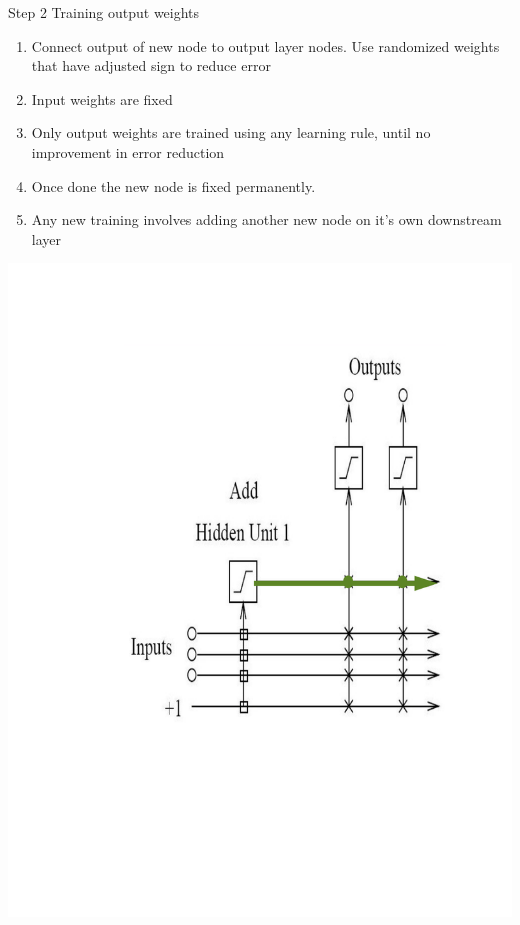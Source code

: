 \documentclass[presentation]{beamer}
\begin{document}
\begin{frame}[label={sec:org085d5cb}]{Step 2 Training output weights}
\begin{enumerate}
  \item Connect output of new node to output layer nodes.
  Use randomized weights that have adjusted sign to reduce error
  \item Input weights are fixed
  \item Only output weights are trained using any learning rule, until no improvement in error reduction
  \item Once done the new node is fixed permanently.
  \item Any new training involves adding another new node on it's own downstream layer
\end{enumerate}
  \begin{center}
    \includegraphics[scale=0.20]{trainoutputunit.png}
  \end{center}
\end{frame}
\end{document}
